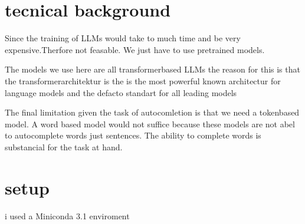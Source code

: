 

\pagebreak
\section{tecnical background}
Since the training of LLMs would take to much time and be very expensive.Therfore not feasable. We just have to use pretrained models.


The models we use here are all transformerbased LLMs the reason for this is that the transformerarchitektur is the is the most powerful known architectur for language models and the defacto standart for all leading models

The final limitation given the task of autocomletion is that we need a tokenbased model. A word based model would not suffice because these models are not abel to autocomplete words just sentences. The ability to complete words is substancial for the task at hand.

\pagebreak



\section{setup}\raggedbottom

i used a Miniconda 3.1 enviroment

